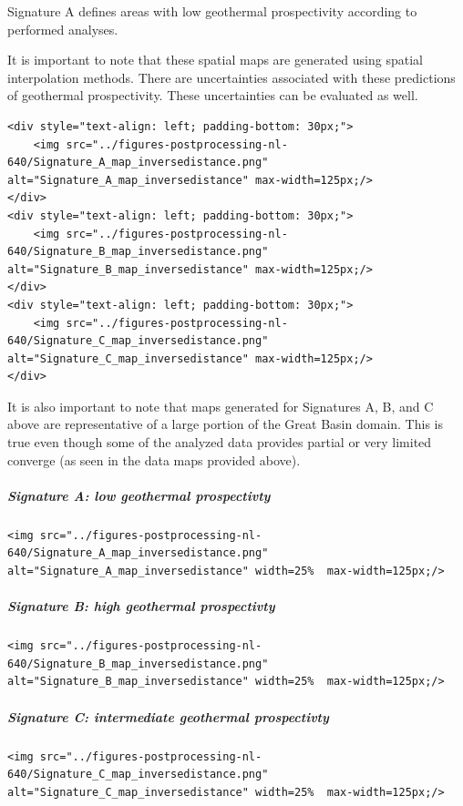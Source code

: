 \documentclass[11pt]{article}
\begin{document}
Signature A defines areas with low geothermal prospectivity according to
performed analyses.

It is important to note that these spatial maps are generated using
spatial interpolation methods. There are uncertainties associated with
these predictions of geothermal prospectivity. These uncertainties can
be evaluated as well.

\begin{verbatim}
<div style="text-align: left; padding-bottom: 30px;">
    <img src="../figures-postprocessing-nl-640/Signature_A_map_inversedistance.png" alt="Signature_A_map_inversedistance" max-width=125px;/>
</div>
<div style="text-align: left; padding-bottom: 30px;">
    <img src="../figures-postprocessing-nl-640/Signature_B_map_inversedistance.png" alt="Signature_B_map_inversedistance" max-width=125px;/>
</div>    
<div style="text-align: left; padding-bottom: 30px;">
    <img src="../figures-postprocessing-nl-640/Signature_C_map_inversedistance.png" alt="Signature_C_map_inversedistance" max-width=125px;/>
</div>
\end{verbatim}

It is also important to note that maps generated for Signatures A, B,
and C above are representative of a large portion of the Great Basin
domain. This is true even though some of the analyzed data provides
partial or very limited converge (as seen in the data maps provided
above).

\hypertarget{signature-a-low-geothermal-prospectivty}{%
\subparagraph{Signature A: low geothermal
prospectivty}\label{signature-a-low-geothermal-prospectivty}}

\begin{verbatim}
<img src="../figures-postprocessing-nl-640/Signature_A_map_inversedistance.png" alt="Signature_A_map_inversedistance" width=25%  max-width=125px;/>
\end{verbatim}

\hypertarget{signature-b-high-geothermal-prospectivty}{%
\subparagraph{Signature B: high geothermal
prospectivty}\label{signature-b-high-geothermal-prospectivty}}

\begin{verbatim}
<img src="../figures-postprocessing-nl-640/Signature_B_map_inversedistance.png" alt="Signature_B_map_inversedistance" width=25%  max-width=125px;/>
\end{verbatim}

\hypertarget{signature-c-intermediate-geothermal-prospectivty}{%
\subparagraph{Signature C: intermediate geothermal
prospectivty}\label{signature-c-intermediate-geothermal-prospectivty}}

\begin{verbatim}
<img src="../figures-postprocessing-nl-640/Signature_C_map_inversedistance.png" alt="Signature_C_map_inversedistance" width=25%  max-width=125px;/>
\end{verbatim}


    
    
    
\end{document}
